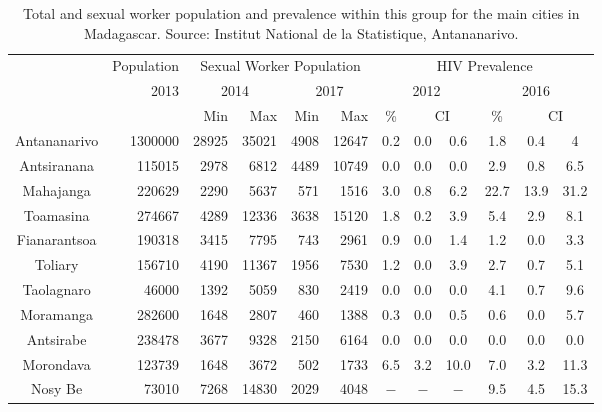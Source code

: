 \documentclass[preprint,12pt]{elsarticle}
\begin{document}

\begin{table}
\caption{Total and sexual worker population and prevalence within this group for the main cities in Madagascar. Source: Institut National de la Statistique, Antananarivo.}
\bigskip
\centering
\begin{tabular}{crrrrrcccccc}
\hline
\hline
\rowcolor{blue!15}  
        & Population & \multicolumn{4}{c}{Sexual Worker Population} & \multicolumn{6}{c}{HIV Prevalence} \\
\rowcolor{blue!15}  
        & 2013       & \multicolumn{2}{c}{2014} & \multicolumn{2}{c}{2017} & \multicolumn{3}{c}{2012} & \multicolumn{3}{c}{2016} \\
\rowcolor{blue!15}  
        &            & {\small Min} & {\small Max} & {\small Min} & {\small Max}& \% & \multicolumn{2}{c}{\small CI} & \% & \multicolumn{2}{c}{\small CI}\\
\hline
Antananarivo  & 1300000 & 28925 & 35021 & 4908	& 12647 & 0.2  & 0.0  & 0.6  & 1.8  & 0.4  & 4    \\ 
Antsiranana   & 115015  & 2978  & 6812  & 4489	& 10749 & 0.0  & 0.0  & 0.0  & 2.9  & 0.8  & 6.5  \\
Mahajanga     & 220629  & 2290  & 5637  & 571	& 1516  & 3.0  & 0.8  & 6.2  & 22.7 & 13.9 & 31.2 \\ 
Toamasina     & 274667  & 4289  & 12336 & 3638	& 15120 & 1.8  & 0.2  & 3.9  & 5.4  & 2.9  & 8.1  \\
Fianarantsoa  & 190318  & 3415  & 7795  & 743	& 2961  & 0.9  & 0.0  & 1.4  & 1.2  & 0.0  & 3.3  \\
Toliary       & 156710  & 4190  & 11367 & 1956	& 7530  & 1.2  & 0.0  & 3.9  & 2.7  & 0.7  & 5.1  \\
Taolagnaro    & 46000   & 1392  & 5059  & 830	& 2419  & 0.0  & 0.0  & 0.0  & 4.1  & 0.7  & 9.6  \\
Moramanga     & 282600  & 1648  & 2807  & 460	& 1388  & 0.3  & 0.0  & 0.5  & 0.6  & 0.0  & 5.7  \\
Antsirabe     & 238478  & 3677  & 9328  & 2150	& 6164  & 0.0  & 0.0  & 0.0  & 0.0  & 0.0  & 0.0  \\
Morondava     & 123739  & 1648  & 3672  & 502	& 1733  & 6.5  & 3.2  & 10.0 & 7.0  & 3.2  & 11.3 \\
Nosy Be       & 73010   & 7268  & 14830 & 2029	& 4048  & $-$  & $-$  & $-$  & 9.5  & 4.5  & 15.3 \\
\hline\hline
\end{tabular}
\label{Table:Madagascar_Cities}
\end{table}
\end{document}
